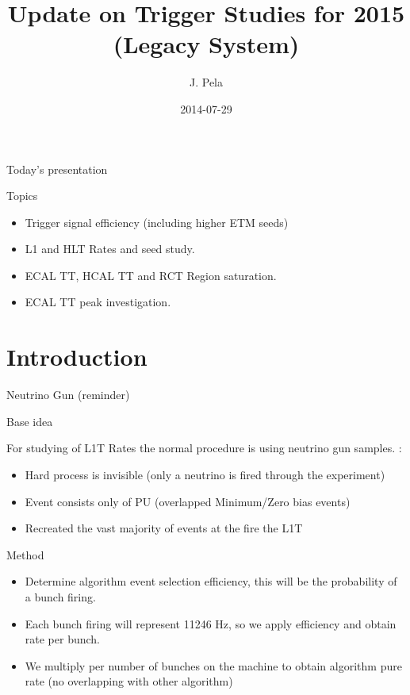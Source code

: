 \documentclass[8pt]{beamer}
\author[J. Pela]{J. Pela}
\title{Update on Trigger Studies for 2015 (Legacy System)}
\institute[ICL]{Imperial College London}
\date{2014-07-29}
\begin{document}
\setlength{\unitlength}{1mm}

\begin{frame}
  \titlepage
\end{frame}

\begin{frame}{Today's presentation}

\begin{block}{Topics}
 
\begin{itemize}
  \item Trigger signal efficiency (including higher ETM seeds) 
  \item L1 and HLT Rates and seed study.
  \item ECAL TT, HCAL TT and RCT Region saturation.
  \item ECAL TT peak investigation.
\end{itemize}

\end{block}

\end{frame}

\section{Introduction}

\begin{frame}{Neutrino Gun (reminder)}

\begin{block}{Base idea}
 
For studying of L1T Rates the normal procedure is using neutrino gun samples. :
\begin{itemize}
 \item Hard process is invisible (only a neutrino is fired through the experiment)
 \item Event consists only of PU (overlapped Minimum/Zero bias events)
 \item Recreated the vast majority of events at the fire the L1T
\end{itemize}

\end{block}

\begin{block}{Method}
 
\begin{itemize}
 \item Determine algorithm event selection efficiency, this will be the probability of a bunch firing.
 \item Each bunch firing will represent 11246 Hz, so we apply efficiency and obtain rate per bunch.
 \item We multiply per number of bunches on the machine to obtain algorithm pure rate (no overlapping with other algorithm)
\end{itemize}
 
\end{block}

\end{frame}
\end{document}
